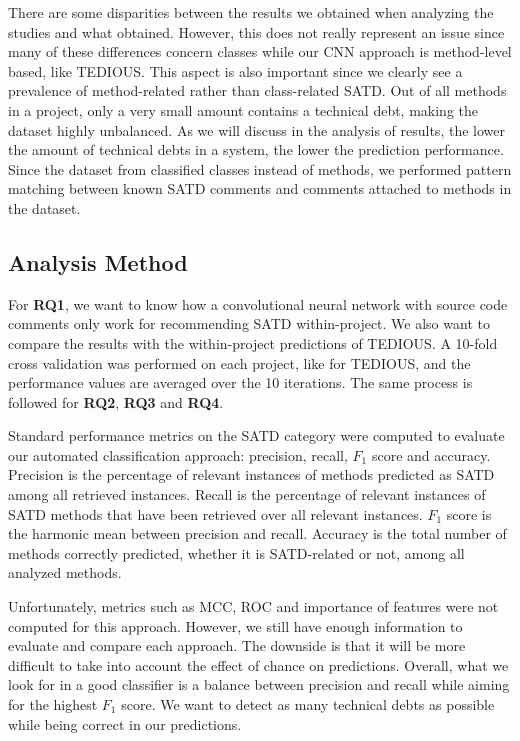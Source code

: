 There are some disparities between the results we obtained when analyzing the studies and what \citet{maldonado17} obtained. However, this does not really represent an issue since many of these differences concern classes while our CNN approach is method-level based, like TEDIOUS. This aspect is also important since we clearly see a prevalence of method-related rather than class-related SATD. Out of all methods in a project, only a very small amount contains a technical debt, making the dataset highly unbalanced. As we will discuss in the analysis of results, the lower the amount of technical debts in a system, the lower the prediction performance. Since the dataset from \citet{maldonado17} classified classes instead of methods, we performed pattern matching between known SATD comments and comments attached to methods in the dataset.

\subsection{Analysis Method}


For \textbf{RQ1}, we want to know how a convolutional neural network with source code comments only work for recommending SATD within-project. We also want to compare the results with the within-project predictions of TEDIOUS. A 10-fold cross validation was performed on each project, like for TEDIOUS, and the performance values are averaged over the 10 iterations. The same process is followed for \textbf{RQ2}, \textbf{RQ3} and \textbf{RQ4}.

Standard performance metrics on the SATD category were computed to evaluate our automated classification approach: precision, recall, $F_1$ score and accuracy. Precision is the percentage of relevant instances of methods predicted as SATD among all retrieved instances. Recall is the percentage of relevant instances of SATD methods that have been retrieved over all relevant instances. $F_1$ score is the harmonic mean between precision and recall. Accuracy is the total number of methods correctly predicted, whether it is SATD-related or not, among all analyzed methods. 

Unfortunately, metrics such as MCC, ROC and importance of features were not computed for this approach. However, we still have enough information to evaluate and compare each approach. The downside is that it will be more difficult to take into account the effect of chance on predictions. Overall, what we look for in a good classifier is a balance between precision and recall while aiming for the highest $F_1$ score. We want to detect as many technical debts as possible while being correct in our predictions.

